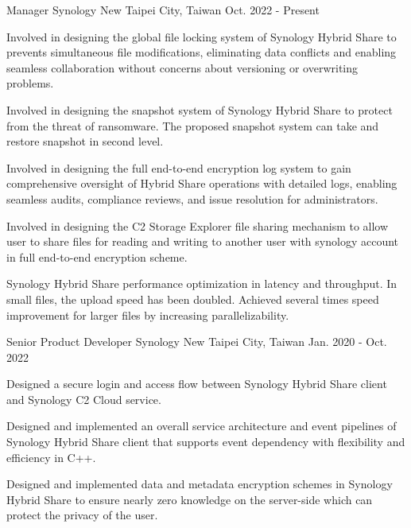 

\begin{cventries}

  \cventry
  {Manager} %
  {Synology} %
  {New Taipei City, Taiwan} %
  {Oct. 2022 - Present} %
  {
    \begin{cvitems} %
      \item {Involved in designing the global file locking system of Synology Hybrid Share to prevents simultaneous file modifications, eliminating data conflicts and enabling seamless collaboration without concerns about versioning or overwriting problems.}
      \item {Involved in designing the snapshot system of Synology Hybrid Share to protect from the threat of ransomware. The proposed snapshot system can take and restore snapshot in second level.}
      \item {Involved in designing the full end-to-end encryption log system to gain comprehensive oversight of Hybrid Share operations with detailed logs, enabling seamless audits, compliance reviews, and issue resolution for administrators.}
      \item {Involved in designing the C2 Storage Explorer file sharing mechanism to allow user to share files for reading and writing to another user with synology account in full end-to-end encryption scheme.}
      \item {Synology Hybrid Share performance optimization in latency and throughput. In small files, the upload speed has been doubled. Achieved several times speed improvement for larger files by increasing parallelizability.}
    \end{cvitems}
  }

  \cventry
    {Senior Product Developer} %
    {Synology} %
    {New Taipei City, Taiwan} %
    {Jan. 2020 - Oct. 2022} %
    {
      \begin{cvitems} %
        \item {Designed a secure login and access flow between Synology Hybrid Share client and Synology C2 Cloud service.}
        \item {Designed and implemented an overall service architecture and event pipelines of Synology Hybrid Share client that supports event dependency with flexibility and efficiency in C++.}
        \item {Designed and implemented data and metadata encryption schemes in Synology Hybrid Share to ensure nearly zero knowledge on the server-side which can protect the privacy of the user.}
      \end{cvitems}
    }


\end{cventries}
